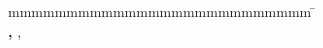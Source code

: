 
\begin{titlepage}
	
	
	\enlargethispage{20mm}
	\begin{center}
		\vspace*{12mm}	{\LARGE\textbf \titel }\\
		\vspace*{12mm}	{\large\textbf \arbeit}\\
		\vspace*{12mm}	\langdeckblattabschlusshinleitung\\
		\vspace*{3mm}		{\textbf \abschluss}\\
		\vspace*{12mm}	\langartikelstudiengang{} \langstudiengang{} \studiengang\\
    \vspace*{3mm}		\langanderdh{} \dhbw\\
		\vspace*{12mm}	\langvon\\
		\vspace*{3mm}		{\large\textbf \autor}\\
		\vspace*{12mm}	\datumAbgabe\\
	\end{center}
	\vfill
	\begin{spacing}{1.2}
	\begin{tabbing}
		mmmmmmmmmmmmmmmmmmmmmmmmmm             \= \kill
		\textbf{\langdbbearbeitungszeit}       \>  \zeitraum\\
		\textbf{\langdbmatriknr, \langdbkurs}  \>  \martrikelnr, \kurs\\
		\textbf{\langdbbetreuer}               \>  \betreuer\\
	\end{tabbing}
	\end{spacing}
\end{titlepage}

